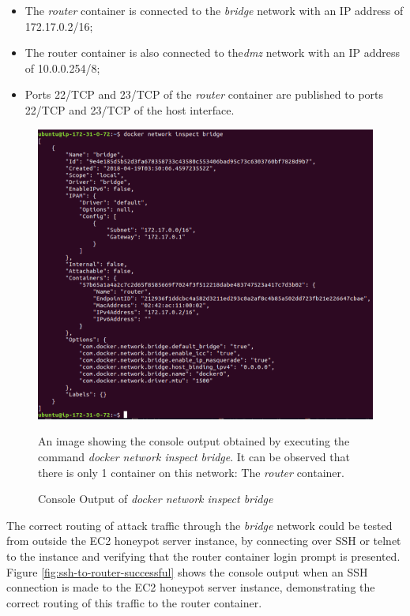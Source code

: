 \begin{itemize}
\item The \textit{router} container is connected to the \textit{bridge} network with an IP address of 172.17.0.2/16;
\item The router container is also connected to the\textit{dmz} network with an IP address of 10.0.0.254/8;
\item Ports 22/TCP and 23/TCP of the \textit{router} container are published to ports 22/TCP and 23/TCP of the host interface.
\end{itemize}

\begin{figure}[ht]
      \centering
      \includegraphics[width=160mm, scale=1]{Images/docker_network_inspect_bridge.PNG}
      \caption{Console Output of \textit{docker network inspect bridge}} 
      \medskip
      \small
		An image showing the console output obtained by executing the command \textit{docker network inspect bridge}. It can be observed that there is only 1 container on this network: The \textit{router} container. 
\label{fig:docker-network-inspect-bridge}
\end{figure}

The correct routing of attack traffic through the \textit{bridge} network could be tested from outside the EC2 honeypot server instance, by connecting over SSH or telnet to the instance and verifying that the router container login prompt is presented. Figure \ref{fig:ssh-to-router-successful} shows the console output when an SSH connection is made to the EC2 honeypot server instance, demonstrating the correct routing of this traffic to the router container.

